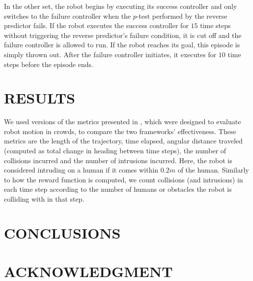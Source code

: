 \documentclass[letterpaper, 10 pt, conference]{ieeeconf}  %
\begin{document}
	In the other set, the robot begins by executing its success controller and only switches to the failure controller when the $p$-test performed by the reverse predictor fails. If the robot executes the success controller for $15$ time steps without triggering the reverse predictor's failure condition, it is cut off and the failure controller is allowed to run. If the robot reaches its goal, this episode is simply thrown out. After the failure controller initiates, it executes for $10$ time steps before the episode ends. 

\section{RESULTS}
	We used versions of the metrics presented in \cite{metrics}, which were designed to evaluate robot motion in crowds, to compare the two frameworks' effectiveness. These metrics are the length of the trajectory, time elapsed, angular distance traveled (computed as total change in heading between time steps), the number of collisions incurred and the number of intrusions incurred. Here, the robot is considered intruding on a human if it comes within $0.2m$ of the human. Similarly to how the reward function is computed, we count collisions (and intrusions) in each time step according to the number of humans or obstacles the robot is colliding with in that step. 

\section{CONCLUSIONS}











\section*{ACKNOWLEDGMENT}






\end{document}
